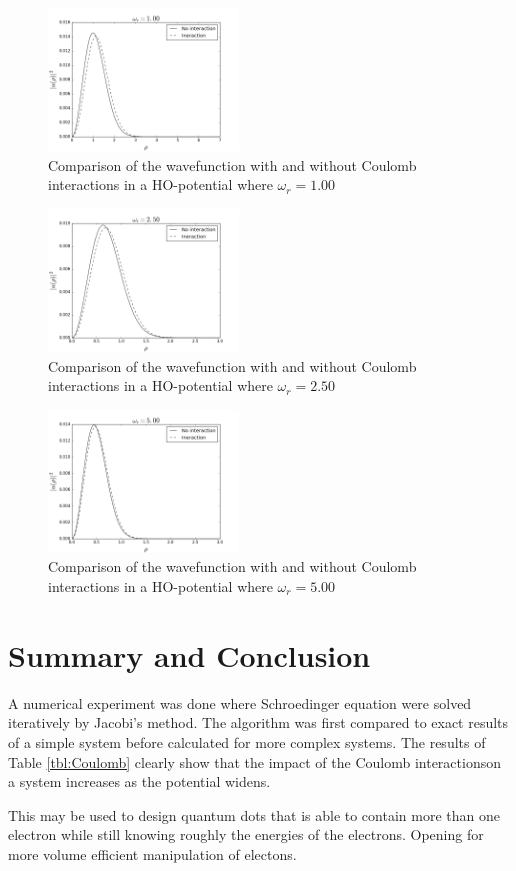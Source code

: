 \documentclass[twoside,twocolumn]{article}
\newcommand{\nl}{
	
	\medskip
	\noindent
}
\newcommand{\SE}{Schroedinger equation }
\newcommand{\CI}{Coulomb interactions}
\begin{document}
	\begin{figure}[p]
		\includegraphics[width=0.45\textwidth]{../report/figures/freq100.png} 
		\caption{Comparison of the wavefunction with and without Coulomb interactions in a HO-potential where $\omega_r=1.00$}\label{fig:fq100}
	\end{figure}
	\begin{figure}[p]
		\includegraphics[width=0.45\textwidth]{../report/figures/freq250.png} 
		\caption{Comparison of the wavefunction with and without Coulomb interactions in a HO-potential where $\omega_r=2.50$}\label{fig:fq250}
	\end{figure}
	\begin{figure}[p]
		\includegraphics[width=0.45\textwidth]{../report/figures/freq500.png} 
		\caption{Comparison of the wavefunction with and without Coulomb interactions in a HO-potential where $\omega_r=5.00$}\label{fig:fq500}
	\end{figure}	%
	\section{Summary and Conclusion}
	\label{sec:conclusion}
	A numerical experiment was done where \SE were solved iteratively by Jacobi's method. The algorithm was first compared to exact results of a simple system before calculated for more complex systems. The results of Table \ref{tbl:Coulomb} clearly show that the impact of the \CI on a system increases as the potential widens.\nl
	This may be used to design quantum dots that is able to contain more than one electron while still knowing roughly the energies of the electrons. Opening for more volume efficient manipulation of electons. 	%
	
	
	
\end{document}
